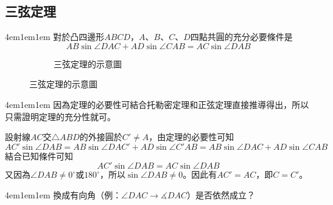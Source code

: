 \documentclass[12pt]{article}
\begin{document}
\subsection{三弦定理}
\begin{mybox}[定理]{4em}{1em}{1em}
    對於凸四邊形$ABCD$，$A$、$B$、$C$、$D$四點共圓的充分必要條件是
    $$
        AB\sin{\angle{DAC}} + AD\sin{\angle{CAB}} = AC\sin{\angle{DAB}}
    $$
    \begin{figure}[H]
        \centering
        \begin{subfigure}[b]{\textwidth}
            \centering
            \caption{三弦定理的示意圖}
            \label{fig:ttc_s2.5-1}
        \end{subfigure}
    \end{figure}
\end{mybox}
\begin{mybox}[證明]{4em}{1em}{1em}
    因為定理的必要性可結合托勒密定理和正弦定理直接推導得出，所以只需證明定理的充分性就可。

    設射線$AC$交$\triangle{ABD}$的外接圓於$C'\neq A$，由定理的必要性可知
    $$
        AC'\sin{\angle{DAB}}=AB\sin{\angle{DAC'}} + AD\sin{\angle{C'AB}}=AB\sin{\angle{DAC}} + AD\sin{\angle{CAB}}
    $$
    結合已知條件可知
    $$
        AC'\sin{\angle{DAB}}=AC\sin{\angle{DAB}}
    $$
    又因為$\angle{DAB}\neq 0^{\circ}$或$180^{\circ}$，所以$\sin{\angle{DAB}}\neq0$。因此有$AC'=AC$，即$C=C'$。
\end{mybox}
\begin{mybox}[思考]{4em}{1em}{1em}
    換成有向角（例：$\angle{DAC}\rightarrow\measuredangle{DAC}$）是否依然成立？
\end{mybox}
\end{document}
